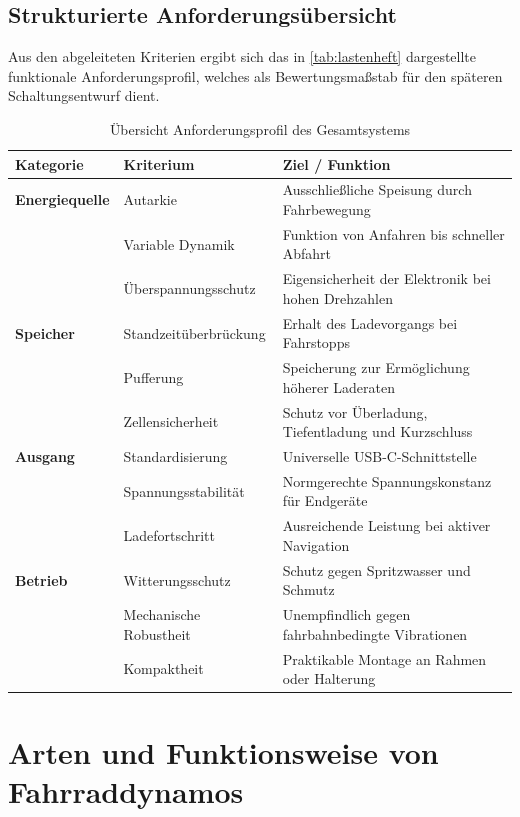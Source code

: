 \documentclass[12pt,a4paper]{article}
\begin{document}
\subsection{Strukturierte Anforderungsübersicht}
Aus den abgeleiteten Kriterien ergibt sich das in \autoref{tab:lastenheft} dargestellte funktionale Anforderungsprofil, 
welches als Bewertungsmaßstab für den späteren Schaltungsentwurf dient.

\begin{table}[htbp]
    \centering
    \caption{Übersicht Anforderungsprofil des Gesamtsystems}
    \label{tab:lastenheft}
    \begin{tabularx}{\textwidth}{p{3.0cm}p{4.2cm}X}
        \toprule
        \textbf{Kategorie} & \textbf{Kriterium} & \textbf{Ziel / Funktion} \\
        \midrule
        \textbf{Energiequelle} & Autarkie & Ausschließliche Speisung durch Fahrbewegung \\
        & Variable Dynamik & Funktion von Anfahren bis schneller Abfahrt \\
        & Überspannungsschutz & Eigensicherheit der Elektronik bei hohen Drehzahlen \\
        \midrule
        \textbf{Speicher} & Standzeitüberbrückung & Erhalt des Ladevorgangs bei Fahrstopps \\
        & Pufferung & Speicherung zur Ermöglichung höherer Laderaten \\
        & Zellensicherheit & Schutz vor Überladung, Tiefentladung und Kurzschluss \\
        \midrule
        \textbf{Ausgang} & Standardisierung & Universelle USB-C-Schnittstelle \\
        & Spannungsstabilität & Normgerechte Spannungskonstanz für Endgeräte \\
        & Ladefortschritt & Ausreichende Leistung bei aktiver Navigation \\
        \midrule
        \textbf{Betrieb} & Witterungsschutz & Schutz gegen Spritzwasser und Schmutz \\
        & Mechanische Robustheit & Unempfindlich gegen fahrbahnbedingte Vibrationen \\
        & Kompaktheit & Praktikable Montage an Rahmen oder Halterung \\
        \bottomrule
    \end{tabularx}
\end{table}



\section{Arten und Funktionsweise von Fahrraddynamos}
\label{sec:dynamos}
\end{document}
